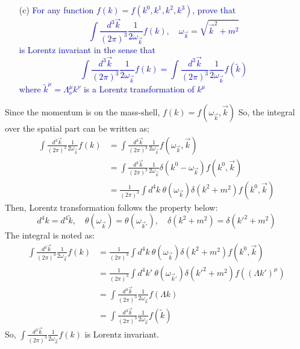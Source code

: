 \documentclass[11pt, a4paper]{article}
\begin{document}
\begin{enumerate}
    \item [(c)] \textcolor{blue}{
    For any function $f(k) = f(k^0, k^1, k^2, k^3)$, prove that
    \begin{equation}\label{eqn:2.6}
        \int \frac{d^3 \vec{k}}{(2\pi)^3} \frac{1}{2\omega_{\vec{k}}} f(k), \quad \omega_{\vec{k}} = \sqrt{\vec{k}^2 + m^2}
    \end{equation}
    is Lorentz invariant in the sense that
    \begin{equation}\label{eqn:2.7}
        \int \frac{d^3 \vec{k}}{(2\pi)^3} \frac{1}{2\omega_{\vec{k}}} f(k) = \int \frac{d^3 \vec{k}}{(2\pi)^3} \frac{1}{2\omega_{\vec{k}}} f(\tilde{k})
    \end{equation}
    where $\tilde{k}^\mu = \Lambda^\mu_\nu k^\nu$ is a Lorentz transformation of $k^\mu$
    }
\end{enumerate}
Since the momentum is on the mass-shell, $f(k) = f(\omega_{\vec{k}},\vec{k})$
So, the integral over the spatial part can be written as;
\begin{align}
    \int \frac{d^3 \vec{k}}{(2\pi)^3} \frac{1}{2\omega_{\vec{k}}} f(k) & = \int \frac{d^3 \vec{k}}{(2\pi)^3} \frac{1}{2\omega_{\vec{k}}} f(\omega_{\vec{k}},\vec{k}) \\
    & = \int \frac{d^3 \vec{k}}{(2\pi)^3} \frac{1}{2\omega_{\vec{k}}} \delta(k^0 - \omega_{\vec{k}}) f(k^0,\vec{k}) \\
    & = \frac{1}{(2\pi)^3}\int d^4k \  \theta(\omega_{\vec{k}})\delta(k^2 + m^2) f(k^0,\vec{k})
\end{align}
Then, Lorentz transformation follows the property below:
$$
d^4 k = d^4\tilde{k}, \quad \theta(\omega_{\vec{k}}) = \theta(\omega_{\vec{k}'}), \quad \delta(k^2+m^2) = \delta(k'^2+m^2)
$$
The integral is noted as:
\begin{align}
    \int \frac{d^3 \vec{k}}{(2\pi)^3} \frac{1}{2\omega_{\vec{k}}} f(k) & = \frac{1}{(2\pi)^3}\int d^4k \  \theta(\omega_{\vec{k}})\delta(k^2 + m^2) f(k^0,\vec{k}) \\
    & = \frac{1}{(2\pi)^3}\int d^4k' \  \theta(\omega_{\vec{k}'})\delta(k'^2 + m^2) f((\Lambda k')^\mu) \\
    & = \int \frac{d^3\vec{k}}{(2\pi)^3} \frac{1}{2\omega_{\vec{k}}} f(\Lambda k) \\
    & = \int \frac{d^3\vec{k}}{(2\pi)^3} \frac{1}{2\omega_{\vec{k}}} f(\tilde{k})
\end{align}
So, $\int \frac{d^3 \vec{k}}{(2\pi)^3} \frac{1}{2\omega_{\vec{k}}} f(k)$ is Lorentz invariant.
\end{document}
